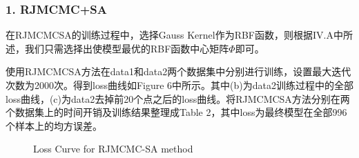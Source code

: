 \documentclass[twocolumn]{article}
\begin{document}
\subsubsection*{1. RJMCMC+SA}

在RJMCMCSA的训练过程中，选择Gauss Kernel作为RBF函数，则根据IV.A中所述，我们只需选择出使模型最优的RBF函数中心矩阵$\Phi$即可。

使用RJMCMCSA方法在data1和data2两个数据集中分别进行训练，设置最大迭代次数为2000次。得到loss曲线如Figure 6中所示。其中(b)为data2训练过程中的全部loss曲线，(c)为data2去掉前20个点之后的loss曲线。将RJMCMCSA方法分别在两个数据集上的时间开销及训练结果整理成Table 2，其中loss为最终模型在全部996个样本上的均方误差。

\begin{figure}[H]
  \centering
  \hspace{0in}
  \hspace{0in}
  \caption{Loss Curve for RJMCMC-SA method}
\end{figure}
\end{document}
